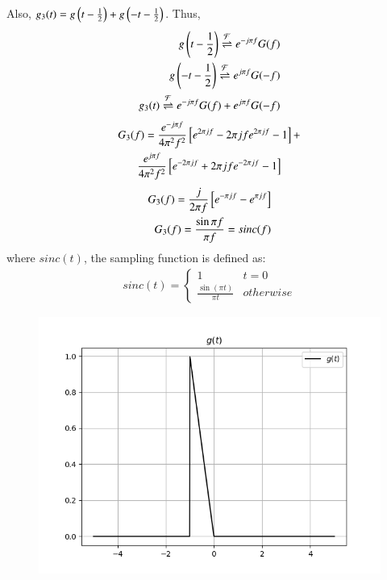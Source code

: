 \documentclass[journal,12pt,twocolumn]{IEEEtran}
\begin{document}
Also, $g_3(t) = g\left(t - \frac{1}{2}\right) + g\left(-t - \frac{1}{2}\right)$. Thus, 
\begin{align}
    g\left(t - \frac{1}{2}\right) \overset{\mathcal{F}}{ \rightleftharpoons} e^{-j\pi f}G(f)\\
    g\left(-t-\frac{1}{2}\right) \overset{\mathcal{F}}{ \rightleftharpoons} e^{j\pi f}G(-f)\\
    g_3(t) \overset{\mathcal{F}}{ \rightleftharpoons} e^{-j\pi f}G(f) + e^{j\pi f}G(-f)
    \end{align}
    \begin{multline}
    G_3(f)= \frac{e^{-j\pi f}}{4\pi^2f^2}{}\left[e^{2\pi jf} - 2\pi jfe^{2\pi jf} - 1\right] + \\
    \frac{e^{j\pi f}}{4\pi^2f^2}{}\left[ e^{-2\pi jf} + 2\pi jfe^{-2\pi jf} -1\right]\\
    \end{multline}
    \begin{align}
        G_3(f) = \frac{j}{2\pi f}{}\left[e^{-\pi jf} - e^{\pi jf}\right]\\
        G_3(f) = \frac{\sin{\pi f}}{\pi f} = sinc(f)
    \end{align}
    where $sinc(t)$, the sampling function is defined as:
\begin{align}
    sinc(t) = 
    \begin{cases}
    1 & t = 0\\
    \frac{\sin(\pi t)}{\pi t} & otherwise
    \end{cases}
\end{align}
\begin{figure}[!ht]
\centering
 \includegraphics[width=\columnwidth]{graphs/g.png}
\end{figure}
\end{document}
